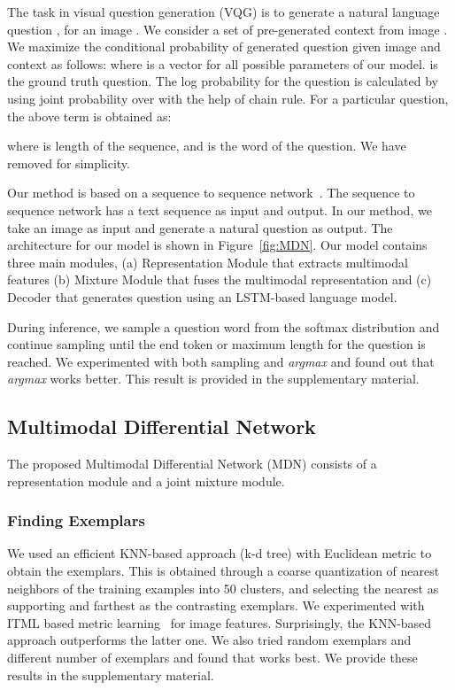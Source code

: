 \documentclass[11pt,a4paper]{article}
\begin{document}
The task in visual question generation (VQG) is to generate a natural language question , for an image . We consider a set of pre-generated context  from image . We maximize the conditional probability of generated question given image and context as follows: 
where  is a vector for all possible parameters of our model.  is the ground truth question. The log probability for the question is calculated by using joint probability over  with the help of chain rule. For a particular question, the above term is obtained as:

where  is length of the sequence, and  is the  word of the question. We have removed  for simplicity. 

Our method is based on a sequence to sequence network~\cite{Sutskever_NIPS2014,Vinyals_CVPR2015,Bahdanau_arXiv2014}. The sequence to sequence network has a text sequence as input and output. In our method, we take an image as input and generate a natural question as output. The architecture for our model is shown in Figure~\ref{fig:MDN}. Our model contains three main modules, (a) Representation Module that extracts multimodal features (b) Mixture Module that fuses the multimodal representation and (c) Decoder that generates question using an LSTM-based language model.

During inference, we sample a question word  from the softmax distribution and continue sampling until the end token or maximum length for the question is reached. 
 We experimented with both sampling and \textit{argmax} and found out that \textit{argmax} works better. This result is provided in the supplementary material.
\subsection{Multimodal Differential Network}
The proposed Multimodal Differential Network (MDN) consists of a representation module and a joint mixture module. 


\subsubsection{Finding Exemplars}
We used an efficient KNN-based approach (k-d tree) with Euclidean metric to obtain the exemplars. This is obtained through a coarse quantization of nearest neighbors of the training examples into 50 clusters, and selecting the nearest as supporting and farthest as the contrasting exemplars. 
 We experimented with ITML based metric learning~\cite{davis_ACM2007} for image features. Surprisingly, the KNN-based approach outperforms the latter one. We also tried random exemplars and different number of exemplars and found that  works best. We provide these results in the supplementary material.
\end{document}
